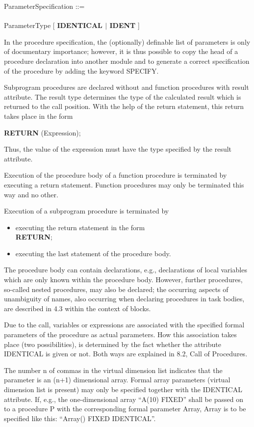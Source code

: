 ParameterSpecification ::=\\
\x [ Identifier ] [ VirtualDimensionList ] [ AssignmentProtection ] \\
\x ParameterType [ {\bf IDENTICAL $\mid$ IDENT} ]

In the procedure specification, the (optionally) definable list of
parameters is only of documentary importance; however, it is thus
possible to copy the head of a procedure declaration into another module
and to generate a correct specification of the procedure by adding the
keyword SPECIFY.

Subprogram procedures are declared without and function procedures with
result attribute. The result type determines the type of the calculated
result which is returned to the call position. With the help of the
return statement, this return takes place in the form

{\bf RETURN} (Expression);

Thus, the value of the expression must have the type specified by the
result attribute.

Execution of the procedure body of a function procedure is terminated by
executing a return statement. Function procedures may only be terminated
this way and no other.

Execution of a subprogram procedure is terminated by
\begin{itemize}
\item executing the return statement in the form\\
      {\bf RETURN};\\
\item executing the last statement of the procedure body.
\end{itemize}

The procedure body can contain declarations, e.g., declarations of local
variables which are only known within the procedure body. However,
further procedures, so-called nested procedures, may also be declared; the
occurring aspects of unambiguity of names, also occurring when declaring
procedures in task bodies, are described in 4.3 within the context of
blocks.

Due to the call, variables or expressions are associated with the
specified formal parameters of the procedure as actual parameters. How
this association takes place (two possibilities), is determined by the
fact whether the attribute IDENTICAL is given or not. Both ways are
explained in 8.2, Call of Procedures.

The number n of commas in the virtual dimension list indicates that the
parameter is an (n+1) dimensional array. Formal array parameters
(virtual dimension list is present) may only be specified together with
the IDENTICAL attribute. If, e.g., the one-dimensional array ``A(10)
FIXED'' shall be passed on to a procedure P with the corresponding
formal parameter Array, Array is to be specified like this: ``Array()
FIXED IDENTICAL''.

